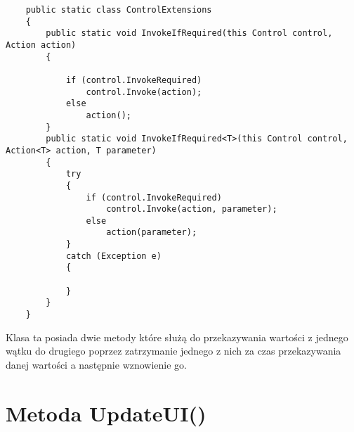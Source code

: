\documentclass[11pt,a4paper]{article}
\begin{document}
\begin{lstlisting}
    public static class ControlExtensions
    {
        public static void InvokeIfRequired(this Control control, Action action)
        {

            if (control.InvokeRequired)
                control.Invoke(action);
            else
                action();
        }
        public static void InvokeIfRequired<T>(this Control control, Action<T> action, T parameter)
        {
            try
            {
                if (control.InvokeRequired)
                    control.Invoke(action, parameter);
                else
                    action(parameter);
            }
            catch (Exception e)
            {

            }
        }
    }
\end{lstlisting}
Klasa ta posiada dwie metody które służą do przekazywania wartości z jednego wątku do drugiego poprzez zatrzymanie jednego z nich za czas przekazywania danej wartości a następnie wznowienie go.
\newline
{}
\section*{Metoda UpdateUI()}
\end{document}
